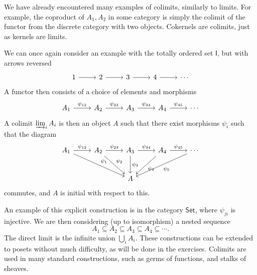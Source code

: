 We have already encountered many examples of colimits, similarly to limits. For example, the coproduct of $A_1,A_2$ in some category is simply the colimit of the functor from the discrete category with two objects. Cokernels are colimits, just as kernels are limits.

We can once again consider an example with the totally ordered set $\mathsf{I} $, but with arrows reversed
\[\begin{tikzcd}[row sep = 2.5em, column sep = 2.5em]
	1\arrow[r]&2\arrow[r]&3\arrow[r]&4\arrow[r]&\cdots 
\end{tikzcd}\]
A functor then consists of a choice of elements and morphisms
\[\begin{tikzcd}[row sep = 2.5em, column sep = 2.5em]
	A_1\arrow[r, "\psi_{12} "]&A_2\arrow[r, "\psi _{23} "]&A_3\arrow[r, "\psi_{34} "]&A_4\arrow[r, "\psi_{45} "]&\cdots 
\end{tikzcd}\]
A colimit $\varinjlim_i A_i$ is then an object $A$ such that there exist morphisms $\psi_i$ such that the diagram
\[\begin{tikzcd}[row sep = 2.5em, column sep = 2.5em]
	A_1\arrow[drr,"\psi _1"]\arrow[r, "\psi_{12} "]&A_2\arrow[dr,"\psi _2"]\arrow[r, "\psi _{23} "]&A_3\arrow[d,"\psi _3"]\arrow[r, "\psi_{34} "]&A_4\arrow[dl,"\psi _4"]\arrow[r, "\psi_{45} "]&\cdots\arrow[dll,"\psi _5"]\\
				  &&A
\end{tikzcd}\]
commutes, and $A$ is initial with respect to this.

An example of this explicit construction is in the category $\mathsf{Set} $, where $\psi_{ji} $ is injective. We are then considering (up to isomorphism) a nested sequence
\[
	A_1\subseteq A_2\subseteq A_3\subseteq A_4\subseteq \cdots 
.\]
The direct limit is the infinite union $\bigcup_{i} A_i$. These constructions can be extended to posets without much difficulty, as will be done in the exercises. Colimits are used in many standard constructions, such as germs of functions, and stalks of sheaves.


